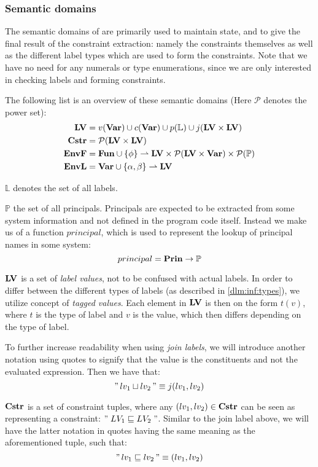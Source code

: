 \subsubsection{Semantic domains}
The semantic domains of \thelang{} are primarily used to maintain state, and to give the final result of the constraint extraction: namely the constraints themselves as well as the different label types which are used to form the constraints.
Note that we have no need for any numerals or type enumerations, since we are only interested in checking labels and forming constraints.

The following list is an overview of these semantic domains (Here $\mathcal P$ denotes the power set):
\begin{align*}
\mathbf{LV}    & = v(\mathbf{Var}) \cup c(\mathbf{Var}) \cup p(\mathbb{L}) \cup j(\mathbf{LV} \times \mathbf{LV}) \\
\mathbf{Cstr}  & = \mathcal P (\mathbf{LV} \times \mathbf{LV}) \\
\mathbf{EnvF}  & = \mathbf{Fun} \cup \{ \phi \} \rightharpoonup \mathbf{LV} \times \mathcal P (\mathbf{LV} \times \mathbf{Var}) \times \mathcal P(\mathbb{P}) \\
\mathbf{EnvL}  & = \mathbf{Var} \cup \{ \alpha, \beta \} \rightharpoonup \mathbf{LV}
\end{align*}

$\mathbb L$ denotes the set of all labels.

$\mathbb P$ the set of all principals.
Principals are expected to be extracted from some system information and not defined in the program code itself.
Instead we make us of a function $principal$, which is used to represent the lookup of principal names in some system:
\[ principal = \mathbf{Prin} \rightarrow \mathbb P \]

$\mathbf{LV}$ is a set of \emph{label values}, not to be confused with actual labels.
In order to differ between the different types of labels (as described in \cref{dlm:inf:types}), we utilize concept of \emph{tagged values}.
Each element in $\mathbf{LV}$ is then on the form $t(v)$, where $t$ is the type of label and $v$ is the value, which then differs depending on the type of label.

To further increase readability when using \emph{join labels}, we will introduce another notation using quotes to signify that the value is the constituents and not the evaluated expression.
Then we have that:
\[ "\,lv_1 \sqcup lv_2\," \equiv j(lv_1, lv_2) \]

$\mathbf{Cstr}$ is a set of constraint tuples, where any $(lv_1, lv_2) \in \mathbf{Cstr}$ can be seen as representing a constraint: $" \; LV_1 \sqsubseteq LV_2 \; "$.
Similar to the join label above, we will have the latter notation in quotes having the same meaning as the aforementioned tuple, such that:
\[ "\,lv_1 \sqsubseteq lv_2\," \equiv (lv_1, lv_2) \]

